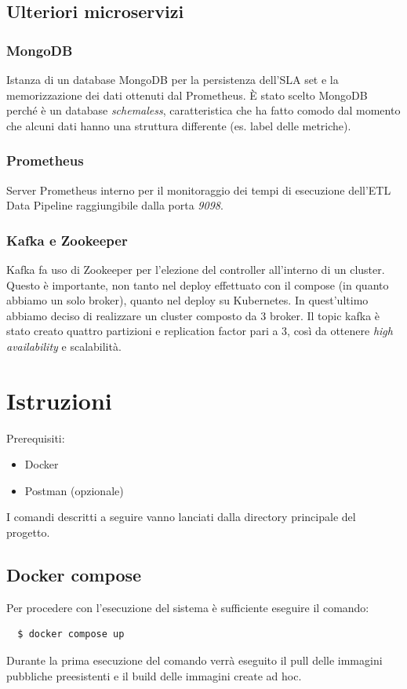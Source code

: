 \documentclass{article}
\begin{document}
    \subsection{Ulteriori microservizi}
        \subsubsection{MongoDB} Istanza di un database MongoDB per la persistenza dell'SLA set e la memorizzazione dei dati ottenuti dal Prometheus. È stato scelto MongoDB perché è un database \textit{schemaless}, caratteristica che ha fatto comodo dal momento che alcuni dati hanno una struttura differente (es. label delle metriche).
        \subsubsection{Prometheus} Server Prometheus interno per il monitoraggio dei tempi di esecuzione dell'ETL Data Pipeline raggiungibile dalla porta \textit{9098}.
        \subsubsection{Kafka e Zookeeper} \label{sec:kafka}
            Kafka fa uso di Zookeeper per l'elezione del controller all'interno di un cluster. Questo è importante, non tanto nel deploy effettuato con il compose (in quanto abbiamo un solo broker), quanto nel deploy su Kubernetes. In quest'ultimo abbiamo deciso di realizzare un cluster composto da 3 broker. Il topic kafka è stato creato quattro partizioni e replication factor pari a 3, così da ottenere \textit{high availability} e scalabilità.
    





        
\section{Istruzioni}
Prerequisiti: 
    \begin{itemize}
        \item Docker
        \item Postman (opzionale)
    \end{itemize}
I comandi descritti a seguire vanno lanciati dalla directory principale del progetto.
\subsection{Docker compose}
Per procedere con l'esecuzione del sistema è sufficiente eseguire il comando:  
\begin{verbatim}
  $ docker compose up
\end{verbatim}
Durante la prima esecuzione del comando verrà eseguito il pull delle immagini pubbliche preesistenti e il build delle immagini create ad hoc.
\end{document}
